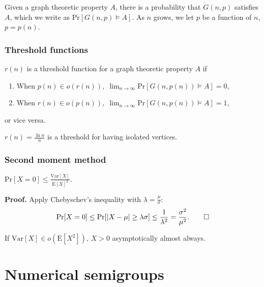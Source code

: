 \documentclass{beamer}
\def\Pr{\ensuremath{\mathrm{Pr}}}
\def\Var{\ensuremath{\mathrm{Var}}}
\def\EE{\ensuremath{\mathrm{E}}}
\begin{document}

\begin{frame}
    Given a graph theoretic property $A$, there is a probability that $G(n, p)$ satisfies $A$, which we write as $\Pr[G(n, p) \vDash A]$. As $n$ grows, we let $p$ be a function of $n$, $p = p(n)$. \par
\frametitle{Threshold functions}
\begin{definition}\label{def:probmet:threshold}
    $r(n)$ is a threshold function for a graph theoretic property $A$ if 
    \begin{enumerate}
        \item When \(p(n) \in o(r(n)), \; \lim_{n \to \infty} \Pr[G(n, p(n)) \vDash A] = 0,\)
        \item When \(r(n) \in o(p(n)), \;  \lim_{n \to \infty} \Pr[G(n, p(n)) \vDash A] = 1,\) 
    \end{enumerate}
    or vice versa.
\end{definition}
\begin{example}
    $\displaystyle{r(n) = \frac{\ln n}{n}}$ is a threshold for having isolated vertices. 
\end{example}
\end{frame}



\begin{frame}
    \frametitle{Second moment method}
    \begin{theorem}\label{thm:probmet:secondmoment:1}
        \(\Pr[X = 0] \leq \frac{\Var[X]}{\EE[X]^2}.\)
    \end{theorem}
    \textbf{Proof.} Apply Chebyschev's inequality with $\lambda = \frac{\mu}{\sigma}$:
    \[\Pr[X = 0] \leq \Pr[|X - \mu| \geq \lambda \sigma] \leq \frac{1}{\lambda^2} = \frac{\sigma^2}{\mu^2}. \qed \]
    \begin{corollary}\label{cor:probmet:secondmoment:1}
        If $\Var[X] \in o(\EE[X^2])$, $X > 0$ asymptotically almost always. 
    \end{corollary}
    
\end{frame}


\section{Numerical semigroups}
\end{document}
